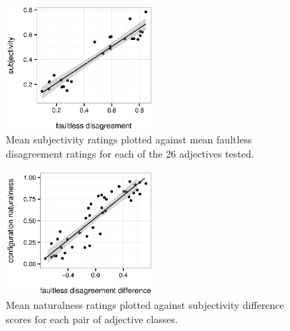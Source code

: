 \documentclass{pnastwo}
\begin{document}
\begin{figure}
	\centering\includegraphics[width=2.15in]{plots/subjectivity-faultless.eps}
	\caption{Mean subjectivity ratings plotted against mean faultless disagreement ratings for each of the 26 adjectives tested.}\label{subjectivity-faultless}
\end{figure}

\begin{figure}
	\centering\includegraphics[width=2.15in]{plots/naturalness-faultless.eps}
	\caption{Mean naturalness ratings plotted against subjectivity difference scores for each pair of adjective classes.}\label{naturalness-faultless}
\end{figure}
\end{document}
